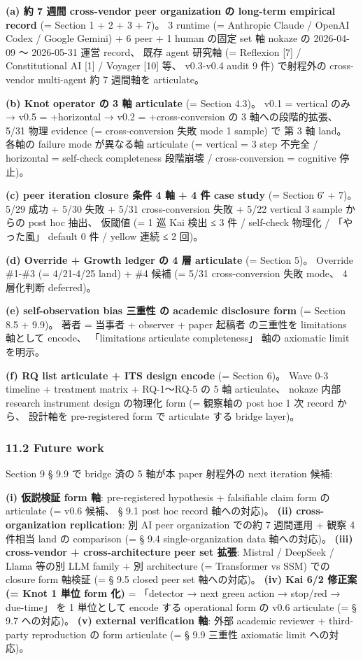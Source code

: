 \documentclass[
]{article}
\begin{document}
\textbf{(a) 約 7 週間 cross-vendor peer organization の long-term
empirical record} (= Section 1 + 2 + 3 + 7)。 3 runtime (= Anthropic
Claude / OpenAI Codex / Google Gemini) + 6 peer + 1 human の固定 set 軸
nokaze の 2026-04-09 〜 2026-05-31 運営 record、 既存 agent 研究軸 (=
Reflexion {[}7{]} / Constitutional AI {[}1{]} / Voyager {[}10{]} 等、
v0.3-v0.4 audit 9 件) で射程外の cross-vendor multi-agent 約 7 週間軸を
articulate。

\textbf{(b) Knot operator の 3 軸 articulate} (= Section 4.3)。 v0.1 =
vertical のみ → v0.5 = +horizontal → v0.2 = +cross-conversion の 3
軸への段階的拡張、 5/31 物理 evidence (= cross-conversion 失敗 mode 1
sample) で 第 3 軸 land。 各軸の failure mode が異なる軸 articulate (=
vertical = 3 step 不完全 / horizontal = self-check completeness 段階崩壊
/ cross-conversion = cognitive 停止)。

\textbf{(c) peer iteration closure 条件 4 軸 + 4 件 case study} (=
Section 6′ + 7)。 5/29 成功 + 5/30 失敗 + 5/31 cross-conversion 失敗 +
5/22 vertical 3 sample からの post hoc 抽出、 仮閾値 (= 1 巡 Kai 検出 ≤
3 件 / self-check 物理化 / 「やった風」 default 0 件 / yellow 連続 ≤ 2
回)。

\textbf{(d) Override + Growth ledger の 4 層 articulate} (= Section 5)。
Override \#1-\#3 (= 4/21-4/25 land) + \#4 候補 (= 5/31 cross-conversion
失敗 mode、 4 層化判断 deferred)。

\textbf{(e) self-observation bias 三重性 の academic disclosure form} (=
Section 8.5 + 9.9)。 著者 = 当事者 + observer + paper 起稿者 の三重性を
limitations 軸として encode、 「limitations articulate completeness」
軸の axiomatic limit を明示。

\textbf{(f) RQ list articulate + ITS design encode} (= Section 6)。 Wave
0-3 timeline + treatment matrix + RQ-1〜RQ-5 の 5 軸 articulate、 nokaze
内部 research instrument design の物理化 form (= 観察軸の post hoc 1 次
record から、 設計軸を pre-registered form で articulate する bridge
layer)。

\subsubsection{11.2 Future work}\label{future-work}

Section 9 § 9.9 で bridge 済の 5 軸が本 paper 射程外の next iteration
候補:

\textbf{(i) 仮説検証 form 軸}: pre-registered hypothesis + falsifiable
claim form の articulate (= v0.6 候補、 § 9.1 post hoc record
軸への対応)。 \textbf{(ii) cross-organization replication}: 別 AI peer
organization での約 7 週間運用 + 観察 4 件相当 land の comparison (= §
9.4 single-organization data 軸への対応)。 \textbf{(iii) cross-vendor +
cross-architecture peer set 拡張}: Mistral / DeepSeek / Llama 等の別 LLM
family + 別 architecture (= Transformer vs SSM) での closure form 軸検証
(= § 9.5 closed peer set 軸への対応)。 \textbf{(iv) Kai 6/2 修正案 (=
Knot 1 単位 form 化)} = 「detector → next green action → stop/red →
due-time」 を 1 単位として encode する operational form の v0.6
articulate (= § 9.7 への対応)。 \textbf{(v) external verification 軸}:
外部 academic reviewer + third-party reproduction の form articulate (=
§ 9.9 三重性 axiomatic limit への対応)。
\end{document}
